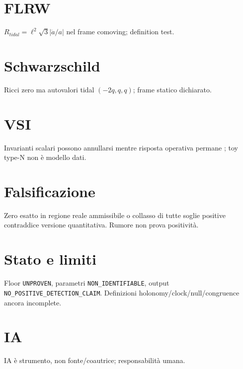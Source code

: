 \documentclass[11pt,a4paper]{article}\usepackage[utf8]{inputenc}\usepackage[T1]{fontenc}\usepackage[italian]{babel}\usepackage{amsmath,amssymb,geometry,hyperref}\geometry{margin=2.7cm}
\begin{document}
\section{FLRW}\label{sec:st-flrw}$R_{tidal}=\ell^2\sqrt3|\ddot a/a|$ nel frame comoving; definition test.
\section{Schwarzschild}\label{sec:st-schwarzschild}Ricci zero ma autovalori tidal $(-2q,q,q)$; frame statico dichiarato.
\section{VSI}\label{sec:st-vsi}Invarianti scalari possono annullarsi mentre risposta operativa permane \cite{PelavasEtAl2005}; toy type-N non è modello dati.
\section{Falsificazione}\label{sec:st-falsification}Zero esatto in regione reale ammissibile o collasso di tutte soglie positive contraddice versione quantitativa. Rumore non prova positività.
\section{Stato e limiti}\label{sec:st-status}Floor \texttt{UNPROVEN}, parametri \texttt{NON\_IDENTIFIABLE}, output \texttt{NO\_POSITIVE\_DETECTION\_CLAIM}. Definizioni holonomy/clock/null/congruence ancora incomplete.
\section{IA}\label{sec:st-ai}IA è strumento, non fonte/coautrice; responsabilità umana.

\end{document}
